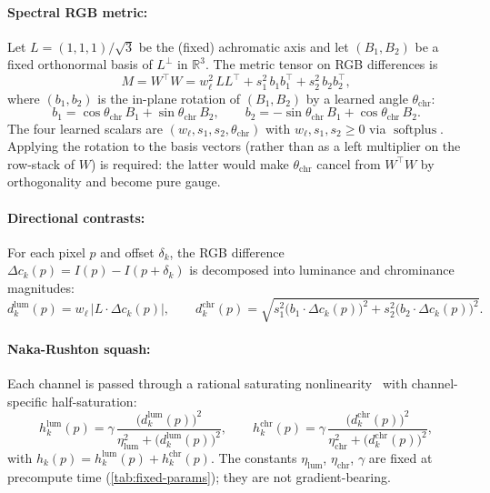 \documentclass[11pt,a4paper]{article}
\newcommand{\R}{\mathbb{R}}
\newcommand{\abs}[1]{\left\lvert#1\right\rvert}
\newcommand{\softplus}{\operatorname{softplus}}
\begin{document}
\paragraph{Spectral RGB metric:}
Let $L = (1,1,1)/\sqrt{3}$ be the (fixed) achromatic axis and let $(B_1, B_2)$ be a fixed orthonormal basis of $L^{\perp}$ in $\R^3$. The metric tensor on RGB differences is
\begin{equation}\label{eq:metric}
  M = W^\top W = w_\ell^2\, L L^\top + s_1^2\, b_1 b_1^\top + s_2^2\, b_2 b_2^\top,
\end{equation}
where $(b_1, b_2)$ is the in-plane rotation of $(B_1, B_2)$ by a learned angle $\theta_{\mathrm{chr}}$:
\begin{equation}
  b_1 = \cos\theta_{\mathrm{chr}}\, B_1 + \sin\theta_{\mathrm{chr}}\, B_2,
  \qquad
  b_2 = -\sin\theta_{\mathrm{chr}}\, B_1 + \cos\theta_{\mathrm{chr}}\, B_2.
\end{equation}
The four learned scalars are $(w_\ell, s_1, s_2, \theta_{\mathrm{chr}})$ with $w_\ell, s_1, s_2 \geq 0$ via $\softplus$. Applying the rotation to the basis vectors (rather than as a left multiplier on the row-stack of $W$) is required: the latter would make $\theta_{\mathrm{chr}}$ cancel from $W^\top W$ by orthogonality and become pure gauge.

\paragraph{Directional contrasts:}
For each pixel $p$ and offset $\delta_k$, the RGB difference $\Delta c_k(p) = I(p) - I(p + \delta_k)$ is decomposed into luminance and chrominance magnitudes:
\begin{equation}\label{eq:dlumchr}
  d_k^{\mathrm{lum}}(p) = w_\ell \,\abs{L \cdot \Delta c_k(p)},
  \qquad
  d_k^{\mathrm{chr}}(p) = \sqrt{s_1^2 \bigl(b_1 \cdot \Delta c_k(p)\bigr)^2 + s_2^2 \bigl(b_2 \cdot \Delta c_k(p)\bigr)^2}.
\end{equation}

\paragraph{Naka-Rushton squash:}
Each channel is passed through a rational saturating nonlinearity~\cite{naka1966srod} with channel-specific half-saturation:
\begin{equation}\label{eq:nr}
  h_k^{\mathrm{lum}}(p) = \gamma\,
    \frac{\bigl(d_k^{\mathrm{lum}}(p)\bigr)^2}
         {\eta_{\mathrm{lum}}^{2} + \bigl(d_k^{\mathrm{lum}}(p)\bigr)^2},
  \qquad
  h_k^{\mathrm{chr}}(p) = \gamma\,
    \frac{\bigl(d_k^{\mathrm{chr}}(p)\bigr)^2}
         {\eta_{\mathrm{chr}}^{2} + \bigl(d_k^{\mathrm{chr}}(p)\bigr)^2},
\end{equation}
with $h_k(p) = h_k^{\mathrm{lum}}(p) + h_k^{\mathrm{chr}}(p)$. The constants $\eta_{\mathrm{lum}}$, $\eta_{\mathrm{chr}}$, $\gamma$ are fixed at precompute time (\cref{tab:fixed-params}); they are not gradient-bearing.
\end{document}
